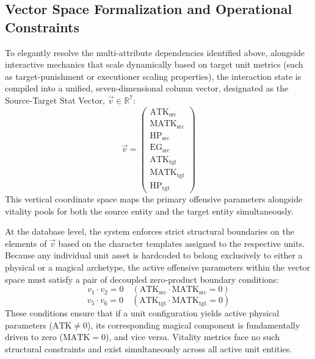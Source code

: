 \documentclass[twocolumn,10pt]{article}
\begin{document}
\subsection{Vector Space Formalization and Operational Constraints}
To elegantly resolve the multi-attribute dependencies identified above, alongside interactive mechanics that scale dynamically based on target unit metrics (such as target-punishment or executioner scaling properties), the interaction state is compiled into a unified, seven-dimensional column vector, designated as the Source-Target Stat Vector, $\vec{v} \in \mathbb{R}^7$:
\begin{equation}
\vec{v} = \begin{pmatrix} 
\text{ATK}_{\text{src}} \\ 
\text{MATK}_{\text{src}} \\ 
\text{HP}_{\text{src}} \\ 
\text{EG}_{\text{src}} \\ 
\text{ATK}_{\text{tgt}} \\ 
\text{MATK}_{\text{tgt}} \\ 
\text{HP}_{\text{tgt}} 
\end{pmatrix}
\end{equation}
This vertical coordinate space maps the primary offensive parameters alongside vitality pools for both the source entity and the target entity simultaneously.

At the database level, the system enforces strict structural boundaries on the elements of $\vec{v}$ based on the character templates assigned to the respective units. Because any individual unit asset is hardcoded to belong exclusively to either a physical or a magical archetype, the active offensive parameters within the vector space must satisfy a pair of decoupled zero-product boundary conditions:
\begin{equation}
v_1 \cdot v_2 = 0 \quad (\text{ATK}_{\text{src}} \cdot \text{MATK}_{\text{src}} = 0)
\label{eq:exclusivity_src}
\end{equation}
\begin{equation}
v_5 \cdot v_6 = 0 \quad (\text{ATK}_{\text{tgt}} \cdot \text{MATK}_{\text{tgt}} = 0)
\label{eq:exclusivity_tgt}
\end{equation}
These conditions ensure that if a unit configuration yields active physical parameters ($\text{ATK} \neq 0$), its corresponding magical component is fundamentally driven to zero ($\text{MATK} = 0$), and vice versa. Vitality metrics face no such structural constraints and exist simultaneously across all active unit entities.
\end{document}
